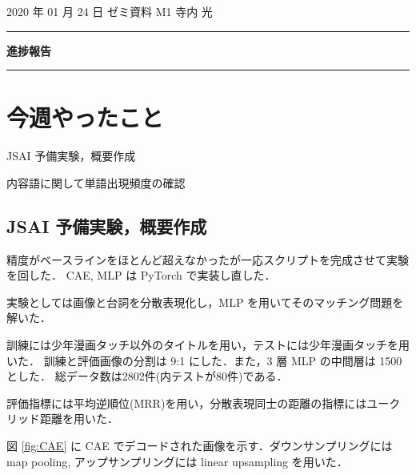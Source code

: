 \documentclass[onecolumn]{ujarticle}   %
\begin{document}
	\noindent

	\hspace{1em}
	2020 年 01 月 24 日
	ゼミ資料
	\hfill
	M1 寺内 光

	\vspace{2mm}

	\hrule

	\begin{center}
		{\Large \bf 進捗報告}
	\end{center}


	\hrule
	\vspace{3mm}

	\section{今週やったこと}
	\begin{itemize}{
		\item{JSAI 予備実験，概要作成}
		\item{内容語に関して単語出現頻度の確認}
	}
	\end{itemize}

	\subsection{JSAI 予備実験，概要作成}
	精度がベースラインをほとんど超えなかったが一応スクリプトを完成させて実験を回した．
	CAE, MLP は PyTorch で実装し直した．

	実験としては画像と台詞を分散表現化し，MLP を用いてそのマッチング問題を解いた．

	訓練には少年漫画タッチ以外のタイトルを用い，テストには少年漫画タッチを用いた．
	訓練と評価画像の分割は 9:1 にした．また，3 層 MLP の中間層は 1500 とした．
	総データ数は2802件(内テストが80件)である．

	評価指標には平均逆順位(MRR)を用い，分散表現同士の距離の指標にはユークリッド距離を用いた．

	図 \ref{fig:CAE} に CAE でデコードされた画像を示す．ダウンサンプリングにはmap pooling, アップサンプリングには linear upsampling を用いた．
\end{document}
